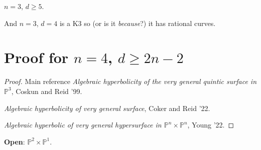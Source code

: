 \begin{thm}\leavevmode
$n=3$, $d \geq 5$.
\end{thm}

And $n=3$, $d=4$ is a  K3 so (or is it \textit{because}?)  it has rational curves.

\section{Proof for $n=4$, $d\geq 2n-2$}


\begin{proof}\leavevmode
	Main reference  \textit{Algebraic hyperbolicity of the very general quintic surface in $\mathbb{P}^3$}, Coskun and Reid '99.

	\textit{Algebraic hyperbolicity of very general surface}, Coker and Reid '22.

	\textit{Algebraic hyperbolic of very general hypersurface in $\mathbb{P}^n\times\mathbb{P}^n$}, Young '22. 
\end{proof}

\textbf{Open}: $\mathbb{P}^2 \times \mathbb{P}^1$.

